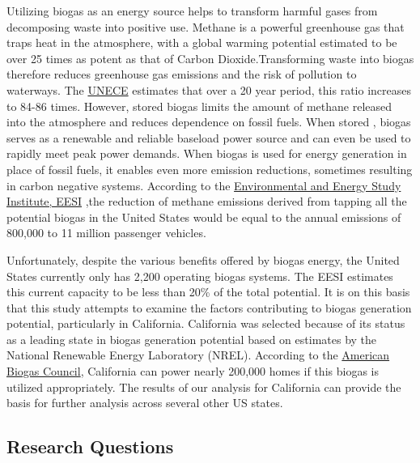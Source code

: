 \documentclass[
  12pt,
]{article}
\begin{document}
Utilizing biogas as an energy source helps to transform harmful gases
from decomposing waste into positive use. Methane is a powerful
greenhouse gas that traps heat in the atmosphere, with a global warming
potential estimated to be over 25 times as potent as that of Carbon
Dioxide.Transforming waste into biogas therefore reduces greenhouse gas
emissions and the risk of pollution to waterways. The
\href{https://unece.org/challenge\#:~:text=Methane\%20is\%20a\%20powerful\%20greenhouses,grows\%20to\%2084\%2D86\%20times.}{UNECE}
estimates that over a 20 year period, this ratio increases to 84-86
times. However, stored biogas limits the amount of methane released into
the atmosphere and reduces dependence on fossil fuels. When stored ,
biogas serves as a renewable and reliable baseload power source and can
even be used to rapidly meet peak power demands. When biogas is used for
energy generation in place of fossil fuels, it enables even more
emission reductions, sometimes resulting in carbon negative systems.
According to the
\href{https://www.eesi.org/papers/view/fact-sheet-biogasconverting-waste-to-energy}{Environmental
and Energy Study Institute, EESI} ,the reduction of methane emissions
derived from tapping all the potential biogas in the United States would
be equal to the annual emissions of 800,000 to 11 million passenger
vehicles.

Unfortunately, despite the various benefits offered by biogas energy,
the United States currently only has 2,200 operating biogas systems. The
EESI estimates this current capacity to be less than 20\% of the total
potential. It is on this basis that this study attempts to examine the
factors contributing to biogas generation potential, particularly in
California. California was selected because of its status as a leading
state in biogas generation potential based on estimates by the National
Renewable Energy Laboratory (NREL). According to the
\href{chrome-extension://efaidnbmnnnibpcajpcglclefindmkaj/viewer.html?pdfurl=https\%3A\%2F\%2Famericanbiogascouncil.org\%2Fwp-content\%2Fuploads\%2F2019\%2F05\%2FABCBiogasStateProfile_CA.pdf\&clen=226298\&chunk=true}{American
Biogas Council}, California can power nearly 200,000 homes if this
biogas is utilized appropriately. The results of our analysis for
California can provide the basis for further analysis across several
other US states.

\hypertarget{research-questions}{%
\subsection{Research Questions}\label{research-questions}}
\end{document}
